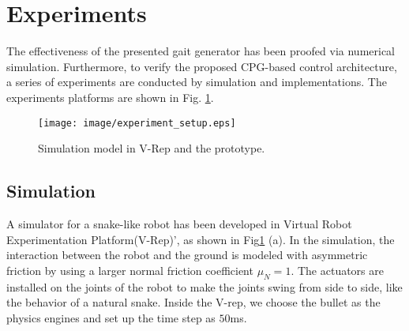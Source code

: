 \documentclass[letterpaper, 10 pt, conference]{ieeeconf}
\begin{document}

\section{Experiments}
The effectiveness of the presented gait generator has been proofed via numerical simulation. Furthermore, to verify the proposed CPG-based control architecture, a series of experiments are conducted by simulation and implementations. The experiments platforms are shown in Fig. \ref{experiment_setup}.

\begin{figure}[!t]
    \centering
    \texttt{[image: image/experiment\_setup.eps]}
    \caption{Simulation model in V-Rep and the prototype.}
    \label{experiment_setup}
\end{figure}

\subsection{Simulation}

A simulator for a snake-like robot has been developed in Virtual Robot Experimentation Platform(V-Rep)', as shown in Fig\ref{experiment_setup} (a). In the simulation, the interaction between the robot and the ground is modeled with asymmetric friction by using a larger normal friction coefficient $\mu_N=1$. The actuators are installed on the joints of the robot to make the joints swing from side to side, like the behavior of a natural snake. Inside the V-rep, we choose the bullet as the physics engines and set up the time step as $50$ms.
\end{document}
